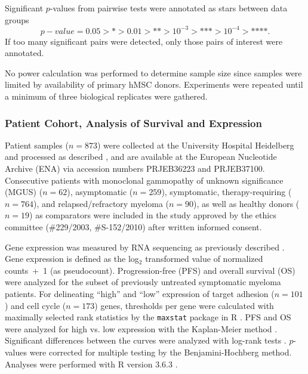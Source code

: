 Significant \(p\)-values from pairwise tests were annotated as stars between
data groups
\[ p-value = 0.05 > \text{*} > 0.01 > \text{**} > 10^{-3} >
    \text{***}> 10^{-4} > \text{****}. \]
If too many significant pairs were
detected, only those pairs of interest were annotated.

No power calculation was performed to determine sample size since samples were
limited by availability of primary hMSC donors. Experiments were repeated until
a minimum of three biological replicates were gathered.


\subsubsection*{Patient Cohort, Analysis of Survival and Expression}
Patient samples (\(n=873\)) were collected at the University Hospital Heidelberg
and processed as described \cite{seckingerTargetExpressionGeneration2017b,
    seckingerCD38ImmunotherapeuticTarget2018}, and are available at the European
Nucleotide Archive (ENA) via accession numbers PRJEB36223 and PRJEB37100.
Consecutive patients with monoclonal gammopathy of unknown significance (MGUS)
(\(n = 62\)), asymptomatic (\(n = 259\)), symptomatic, therapy-requiring (\(n =
764\)), and relapsed/refractory myeloma (\(n = 90\)), as well as healthy donors
(\(n = 19\)) as comparators were included in the study approved by the ethics
committee (\#229/2003, \#S-152/2010) after written informed consent.

Gene expression was measured by RNA sequencing as previously described
\cite{seckingerCD38ImmunotherapeuticTarget2018}. Gene expression is defined as
the log\(_2\) transformed value of normalized counts~+~1 (as pseudocount).
Progression-free (PFS) and overall survival (OS) were analyzed for the subset of
previously untreated symptomatic myeloma patients. For delineating “high” and
“low” expression of target adhesion (\(n=101\)) and cell cycle (\(n=173\))
genes, thresholds per gene were calculated with maximally selected rank
statistics by the \texttt{maxstat} package in R
\cite{hothornMaximallySelectedRank2017}. PFS and OS were analyzed for high
vs. low expression with the Kaplan-Meier method \cite{kaplanNonparametricEstimationIncomplete1958}.
Significant differences between the curves were analyzed with log-rank tests
\cite{harringtonClassRankTest1982}. \(p\)-values were corrected for multiple testing
by the Benjamini-Hochberg method. Analyses were performed with R version 3.6.3
\cite{rcoreteamLanguageEnvironmentStatistical2018}.



